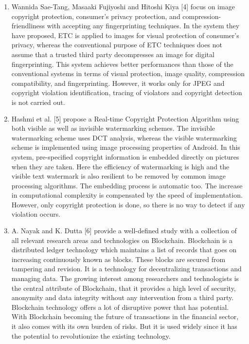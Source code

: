 \documentclass[10pt]{article}
\begin{document}
\begin{enumerate}
\\
\item  Wannida  Sae-Tang,  Masaaki  Fujiyoshi  and  Hitoshi  Kiya [4] focus on image copyright protection, consumer's privacy protection, and compression-friendliness with accepting any fingerprinting techniques. In the system they have proposed, ETC is applied to images for visual protection of consumer's privacy, whereas the conventional purpose of ETC techniques does not assume that a trusted third party decompresses an image for digital fingerprinting. This system achieves better performances than those of the conventional systems in terms of visual protection, image quality, compression compatibility, and fingerprinting. However, it works only for JPEG and copyright violation identification, tracing of violators and copyright detection is not carried out.
\\
\item  Hashmi et al. [5] propose a Real-time Copyright Protection Algorithm using both visible as well
as invisible watermarking schemes. The invisible watermarking scheme uses DCT analysis, whereas the visible watermarking scheme is implemented using image
processing properties of Android. In this system, pre-specified copyright information is embedded directly on pictures when they are taken. Here the  efficiency of watermarking is high and the visible text watermark is also resilient to be removed by common image processing algorithms. The  embedding process is automatic too. The increase in computational complexity is compensated by the speed of implementation. However, only copyright  protection is done, so there is no way to detect if any violation occurs.
\\
\item  A. Nayak and K. Dutta [6] provide a well-defined study with a collection of all relevant research areas and technologies on Blockchain.
Blockchain is a distributed ledger technology which maintains a list of records that goes on increasing continuously known as blocks. These blocks are secured from tampering and revision. It is a technology for decentralizing transactions and managing data. The growing interest among researchers and technologists is the central attribute of Blockchain, that it provides a high level of security, anonymity and data integrity without any intervention from a third party. Blockchain technology offers a lot of disruptive power that has potential. With Blockchain becoming the future of transactions in the financial sector, it also comes with its own burden of risks. But it is used widely since it has the potential to revolutionize the existing technology.

\end{enumerate}
\end{document}
